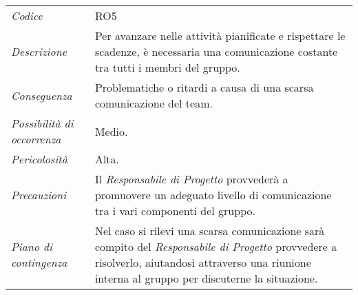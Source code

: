 {{{{{{{{{	\begin{center}
		\renewcommand{\arraystretch}{1.4}
		\begin{longtable}{|p{5cm}|p{12cm}|}
			\hline
			\rowcolor{airforceblue}
			\multicolumn{2}{|c|}{\textit{Scarsa comunicazione}}\\
			\hline
			\textit{Codice} & RO5 \\
			\hline
			\textit{Descrizione} & Per avanzare nelle attività pianificate e rispettare le scadenze, è necessaria una comunicazione costante tra tutti i membri del gruppo.\\
			\hline
			\textit{Conseguenza} & Problematiche o ritardi a causa di una scarsa comunicazione del team. \\
			\hline
			\textit{Possibilità di occorrenza} & Medio. \\
			\hline
			\textit{Pericolosità} & Alta. \\
			\hline
			\textit{Precauzioni} & Il \textit{Responsabile di Progetto} provvederà a promuovere un adeguato livello di comunicazione tra i vari componenti del gruppo.  \\
			\hline
			\textit{Piano di contingenza} & Nel caso si rilevi una scarsa comunicazione sarà compito del \textit{Responsabile di Progetto} provvedere a risolverlo, aiutandosi attraverso una riunione interna al gruppo per discuterne la situazione. \\
			\hline
		\end{longtable}
	\end{center}

\clearpage
\def\tabularxcolumn#1{m{#1}}
{
	
}}}}}}}}}}
